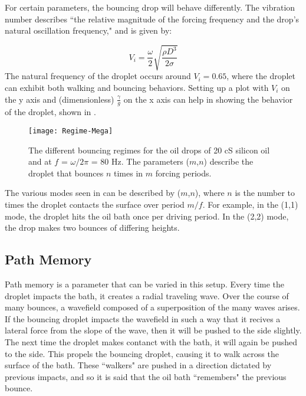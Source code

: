 For certain parameters, the bouncing drop will behave differently. The vibration number describes ``the relative magnitude of the forcing frequency and the drop's natural oscillation frequency," and is given by:
	       	      
\begin{equation} \label{vibrationnumber}
V_i = \frac{\omega}{2}\sqrt{\frac{\rho D^3}{2\sigma}}
\end{equation}   	       	       
	       	       The natural frequency of the droplet occurs around $V_i = 0.65$, where the droplet can exhibit both walking and bouncing behaviors. Setting up a plot with $V_i$ on the y axis and (dimensionless) $\frac{\gamma}{g}$ on the x axis can help in showing the behavior of the droplet, shown in . 
	    
	    \begin{figure}[h]
	   
	       \centering
	    \texttt{[image: Regime-Mega]}
	     \caption{The different bouncing regimes for the oil drops of 20 cS silicon oil and at $f$ = $\omega / 2\pi$ = 80 Hz. The parameters ($m$,$n$) describe the droplet that bounces $n$ times in $m$ forcing periods. }
	 \label{regime}
	\end{figure}

The various modes seen in  can be described by ($m$,$n$), where $n$ is the number to times the droplet contacts the surface over period $m/f$. For example, in the (1,1) mode, the droplet hits the oil bath once per driving period. In the (2,2) mode, the drop makes two bounces of differing heights. 
	       
            \subsection{Path Memory}
            Path memory is a parameter that can be varied in this setup. Every time the droplet impacts the bath, it creates a radial traveling wave. Over the course of many bounces, a wavefield composed of a superposition of the many waves arises. If the bouncing droplet impacts the wavefield in such a way that it recives a lateral force from the slope of the wave, then it will be pushed to the side slightly. The next time the droplet makes contanct with the bath, it will again be pushed to the side. This propels the bouncing droplet, causing it to walk across the surface of the bath. These ``walkers" are pushed in a direction dictated by previous impacts, and so it is said that the oil bath ``remembers" the previous bounce.	  
            
